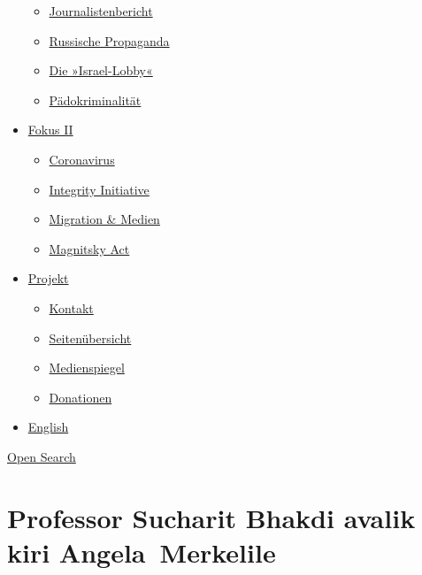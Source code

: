 \begin{itemize}
  \begin{itemize}
  \tightlist
  \item
    \href{https://swprs.org/bericht-eines-journalisten/}{Journalistenbericht}
  \item
    \href{https://swprs.org/russische-propaganda/}{Russische Propaganda}
  \item
    \href{https://swprs.org/die-israel-lobby-fakten-und-mythen/}{Die
    »Israel-Lobby«}
  \item
    \href{https://swprs.org/geopolitik-und-paedokriminalitaet/}{Pädokriminalität}
  \end{itemize}
\item
  \href{https://swprs.org/migration-und-medien/}{Fokus II}

  \begin{itemize}
  \tightlist
  \item
    \href{https://swprs.org/covid-19-hinweis-ii/}{Coronavirus}
  \item
    \href{https://swprs.org/die-integrity-initiative/}{Integrity
    Initiative}
  \item
    \href{https://swprs.org/migration-und-medien/}{Migration \& Medien}
  \item
    \href{https://swprs.org/der-fall-magnitsky/}{Magnitsky Act}
  \end{itemize}
\item
  \href{https://swprs.org/kontakt/}{Projekt}

  \begin{itemize}
  \tightlist
  \item
    \href{https://swprs.org/kontakt/}{Kontakt}
  \item
    \href{https://swprs.org/uebersicht/}{Seitenübersicht}
  \item
    \href{https://swprs.org/medienspiegel/}{Medienspiegel}
  \item
    \href{https://swprs.org/donationen/}{Donationen}
  \end{itemize}
\item
  \href{https://swprs.org/contact/}{English}
\end{itemize}

\protect\hyperlink{}{Open Search}

\hypertarget{professor-sucharit-bhakdi-avalik-kiri-angela-merkelile}{%
\section{Professor Sucharit Bhakdi avalik kiri
Angela~Merkelile}\label{professor-sucharit-bhakdi-avalik-kiri-angela-merkelile}}

